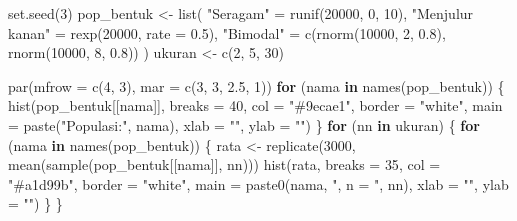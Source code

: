 \documentclass[
  indonesian,
  letterpaper,
]{book}
\newenvironment{Shaded}{\begin{snugshade}}{\end{snugshade}}
\newcommand{\AttributeTok}[1]{\textcolor[rgb]{0.40,0.45,0.13}{#1}}
\newcommand{\ControlFlowTok}[1]{\textcolor[rgb]{0.00,0.23,0.31}{\textbf{#1}}}
\newcommand{\DecValTok}[1]{\textcolor[rgb]{0.68,0.00,0.00}{#1}}
\newcommand{\FloatTok}[1]{\textcolor[rgb]{0.68,0.00,0.00}{#1}}
\newcommand{\FunctionTok}[1]{\textcolor[rgb]{0.28,0.35,0.67}{#1}}
\newcommand{\NormalTok}[1]{\textcolor[rgb]{0.00,0.23,0.31}{#1}}
\newcommand{\OtherTok}[1]{\textcolor[rgb]{0.00,0.23,0.31}{#1}}
\newcommand{\StringTok}[1]{\textcolor[rgb]{0.13,0.47,0.30}{#1}}
\begin{document}
\begin{Shaded}
\begin{Highlighting}[]
\FunctionTok{set.seed}\NormalTok{(}\DecValTok{3}\NormalTok{)}
\NormalTok{pop\_bentuk }\OtherTok{\textless{}{-}} \FunctionTok{list}\NormalTok{(}
  \StringTok{"Seragam"} \OtherTok{=} \FunctionTok{runif}\NormalTok{(}\DecValTok{20000}\NormalTok{, }\DecValTok{0}\NormalTok{, }\DecValTok{10}\NormalTok{),}
  \StringTok{"Menjulur kanan"} \OtherTok{=} \FunctionTok{rexp}\NormalTok{(}\DecValTok{20000}\NormalTok{, }\AttributeTok{rate =} \FloatTok{0.5}\NormalTok{),}
  \StringTok{"Bimodal"} \OtherTok{=} \FunctionTok{c}\NormalTok{(}\FunctionTok{rnorm}\NormalTok{(}\DecValTok{10000}\NormalTok{, }\DecValTok{2}\NormalTok{, }\FloatTok{0.8}\NormalTok{), }\FunctionTok{rnorm}\NormalTok{(}\DecValTok{10000}\NormalTok{, }\DecValTok{8}\NormalTok{, }\FloatTok{0.8}\NormalTok{))}
\NormalTok{)}
\NormalTok{ukuran }\OtherTok{\textless{}{-}} \FunctionTok{c}\NormalTok{(}\DecValTok{2}\NormalTok{, }\DecValTok{5}\NormalTok{, }\DecValTok{30}\NormalTok{)}

\FunctionTok{par}\NormalTok{(}\AttributeTok{mfrow =} \FunctionTok{c}\NormalTok{(}\DecValTok{4}\NormalTok{, }\DecValTok{3}\NormalTok{), }\AttributeTok{mar =} \FunctionTok{c}\NormalTok{(}\DecValTok{3}\NormalTok{, }\DecValTok{3}\NormalTok{, }\FloatTok{2.5}\NormalTok{, }\DecValTok{1}\NormalTok{))}
\ControlFlowTok{for}\NormalTok{ (nama }\ControlFlowTok{in} \FunctionTok{names}\NormalTok{(pop\_bentuk)) \{}
  \FunctionTok{hist}\NormalTok{(pop\_bentuk[[nama]], }\AttributeTok{breaks =} \DecValTok{40}\NormalTok{, }\AttributeTok{col =} \StringTok{"\#9ecae1"}\NormalTok{, }\AttributeTok{border =} \StringTok{"white"}\NormalTok{,}
       \AttributeTok{main =} \FunctionTok{paste}\NormalTok{(}\StringTok{"Populasi:"}\NormalTok{, nama), }\AttributeTok{xlab =} \StringTok{""}\NormalTok{, }\AttributeTok{ylab =} \StringTok{""}\NormalTok{)}
\NormalTok{\}}
\ControlFlowTok{for}\NormalTok{ (nn }\ControlFlowTok{in}\NormalTok{ ukuran) \{}
  \ControlFlowTok{for}\NormalTok{ (nama }\ControlFlowTok{in} \FunctionTok{names}\NormalTok{(pop\_bentuk)) \{}
\NormalTok{    rata }\OtherTok{\textless{}{-}} \FunctionTok{replicate}\NormalTok{(}\DecValTok{3000}\NormalTok{, }\FunctionTok{mean}\NormalTok{(}\FunctionTok{sample}\NormalTok{(pop\_bentuk[[nama]], nn)))}
    \FunctionTok{hist}\NormalTok{(rata, }\AttributeTok{breaks =} \DecValTok{35}\NormalTok{, }\AttributeTok{col =} \StringTok{"\#a1d99b"}\NormalTok{, }\AttributeTok{border =} \StringTok{"white"}\NormalTok{,}
         \AttributeTok{main =} \FunctionTok{paste0}\NormalTok{(nama, }\StringTok{", n = "}\NormalTok{, nn), }\AttributeTok{xlab =} \StringTok{""}\NormalTok{, }\AttributeTok{ylab =} \StringTok{""}\NormalTok{)}
\NormalTok{  \}}
\NormalTok{\}}
\end{Highlighting}
\end{Shaded}
\end{document}
